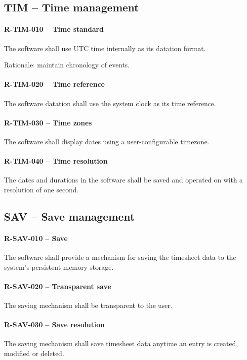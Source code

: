 \subsection{TIM -- Time management}
\paragraph{R-TIM-010 -- Time standard}
The software shall use UTC time internally as its datation format.

Rationale: maintain chronology of events.

\paragraph{R-TIM-020 -- Time reference}
The software datation shall use the system clock as its time reference.

\paragraph{R-TIM-030 -- Time zones}
The software shall display dates using a user-configurable timezone.

\paragraph{R-TIM-040 -- Time resolution}
The dates and durations in the software shall be saved and operated
on with a resolution of one second.

\subsection{SAV -- Save management}
\paragraph{R-SAV-010 -- Save}
The software shall provide a mechanism for saving the timesheet data to
the system's persistent memory storage.

\paragraph{R-SAV-020 -- Transparent save}
The saving mechanism shall be transparent to the user.

\paragraph{R-SAV-030 -- Save resolution}
The saving mechanism shall save timesheet data anytime an entry is
created, modified or deleted.

